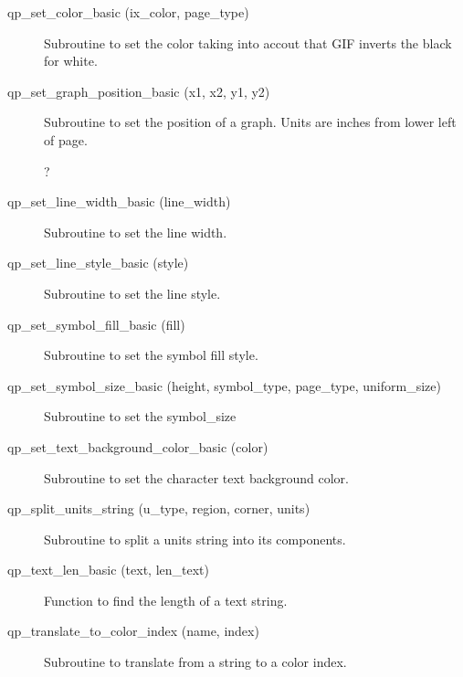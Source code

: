 \begin{description}
\label{r:qp.set.color.basic}
\item[qp_set_color_basic (ix_color, page_type)  ] \Newline 
Subroutine to set the color taking into accout that GIF
inverts the black for white.

\label{r:qp.set.graph.position.basic}
\item[qp_set_graph_position_basic (x1, x2, y1, y2)] \Newline 
Subroutine to set the position of a graph.
Units are inches from lower left of page.

?
\label{r:qp.set.line.width.basic}
\item[qp_set_line_width_basic (line_width)] \Newline 
Subroutine to set the line width.

\label{r:qp.set.line.style.basic}
\item[qp_set_line_style_basic (style)] \Newline 
Subroutine to set the line style.

\label{r:qp.set.symbol.fill.basic}
\item[qp_set_symbol_fill_basic (fill)] \Newline 
Subroutine to set the symbol fill style.

\label{r:qp.set.symbol.size.basic}
\item[qp_set_symbol_size_basic (height, symbol_type, page_type, uniform_size)] \Newline 
Subroutine to set the symbol_size

\label{r:qp.set.text.background.color.basic}
\item[qp_set_text_background_color_basic (color)] \Newline 
Subroutine to set the character text background color.

\label{r:qp.split.units.string}
\item[qp_split_units_string (u_type, region, corner, units)] \Newline 
     Subroutine to split a units string into its components.

\label{r:qp.text.len.basic}
\item[qp_text_len_basic (text, len_text)] \Newline 
Function to find the length of a text string.

\label{r:qp.translate.to.color.index}
\item[qp_translate_to_color_index (name, index)] \Newline 
     Subroutine to translate from a string to a color index.

\end{description}

